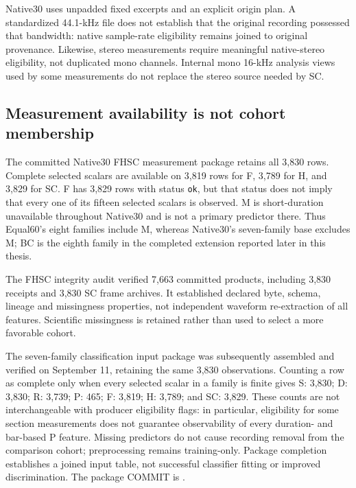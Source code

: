 Native30 uses unpadded fixed excerpts and an explicit origin plan. A standardized
44.1-kHz file does not establish that the original recording possessed that
bandwidth: native sample-rate eligibility remains joined to original provenance.
Likewise, stereo measurements require meaningful native-stereo eligibility,
not duplicated mono channels. Internal mono 16-kHz analysis views used by some
measurements do not replace the stereo source needed by SC.

\subsection{Measurement availability is not cohort membership}

The committed Native30 FHSC measurement package retains all 3,830 rows.
Complete selected scalars are available on 3,819 rows for F, 3,789 for H,
and 3,829 for SC. F has 3,829 rows with status \texttt{ok}, but that status
does not imply that every one of its fifteen selected scalars is observed.
M is short-duration unavailable throughout Native30 and is not a primary
predictor there. Thus Equal60's eight families include M, whereas Native30's
seven-family base excludes M; BC is the eighth family in the completed extension reported later in this thesis.

The FHSC integrity audit verified 7,663 committed products, including 3,830
receipts and 3,830 SC frame archives. It established declared byte, schema,
lineage and missingness properties, not independent waveform re-extraction of
all features. Scientific missingness is retained rather than used to select
a more favorable cohort.

The seven-family classification input package was subsequently assembled and
verified on September 11, retaining the same 3,830 observations. Counting a row
as complete only when every selected scalar in a family is finite gives
S: 3,830; D: 3,830; R: 3,739; P: 465; F: 3,819; H: 3,789; and SC: 3,829.
These counts are not interchangeable with producer eligibility flags: in
particular, eligibility for some section measurements does not guarantee
observability of every duration- and bar-based P feature. Missing predictors
do not cause recording removal from the comparison cohort; preprocessing
remains training-only. Package completion establishes a joined input table,
not successful classifier fitting or improved discrimination.
The package COMMIT is
.

